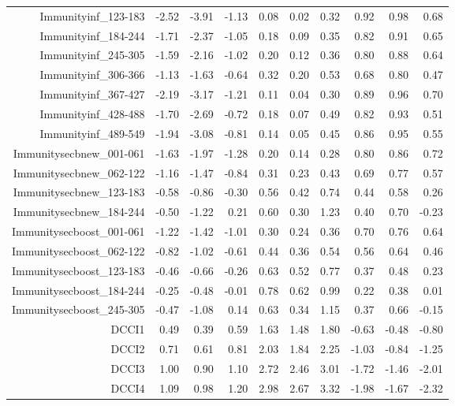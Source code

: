 \begin{table}[ht]
\begin{tabular}{rrrrrrrrrr}
  Immunityinf\_123-183 & -2.52 & -3.91 & -1.13 & 0.08 & 0.02 & 0.32 & 0.92 & 0.98 & 0.68 \\ 
  Immunityinf\_184-244 & -1.71 & -2.37 & -1.05 & 0.18 & 0.09 & 0.35 & 0.82 & 0.91 & 0.65 \\ 
  Immunityinf\_245-305 & -1.59 & -2.16 & -1.02 & 0.20 & 0.12 & 0.36 & 0.80 & 0.88 & 0.64 \\ 
  Immunityinf\_306-366 & -1.13 & -1.63 & -0.64 & 0.32 & 0.20 & 0.53 & 0.68 & 0.80 & 0.47 \\ 
  Immunityinf\_367-427 & -2.19 & -3.17 & -1.21 & 0.11 & 0.04 & 0.30 & 0.89 & 0.96 & 0.70 \\ 
  Immunityinf\_428-488 & -1.70 & -2.69 & -0.72 & 0.18 & 0.07 & 0.49 & 0.82 & 0.93 & 0.51 \\ 
  Immunityinf\_489-549 & -1.94 & -3.08 & -0.81 & 0.14 & 0.05 & 0.45 & 0.86 & 0.95 & 0.55 \\ 
  Immunitysecbnew\_001-061 & -1.63 & -1.97 & -1.28 & 0.20 & 0.14 & 0.28 & 0.80 & 0.86 & 0.72 \\ 
  Immunitysecbnew\_062-122 & -1.16 & -1.47 & -0.84 & 0.31 & 0.23 & 0.43 & 0.69 & 0.77 & 0.57 \\ 
  Immunitysecbnew\_123-183 & -0.58 & -0.86 & -0.30 & 0.56 & 0.42 & 0.74 & 0.44 & 0.58 & 0.26 \\ 
  Immunitysecbnew\_184-244 & -0.50 & -1.22 & 0.21 & 0.60 & 0.30 & 1.23 & 0.40 & 0.70 & -0.23 \\ 
  Immunitysecboost\_001-061 & -1.22 & -1.42 & -1.01 & 0.30 & 0.24 & 0.36 & 0.70 & 0.76 & 0.64 \\ 
  Immunitysecboost\_062-122 & -0.82 & -1.02 & -0.61 & 0.44 & 0.36 & 0.54 & 0.56 & 0.64 & 0.46 \\ 
  Immunitysecboost\_123-183 & -0.46 & -0.66 & -0.26 & 0.63 & 0.52 & 0.77 & 0.37 & 0.48 & 0.23 \\ 
  Immunitysecboost\_184-244 & -0.25 & -0.48 & -0.01 & 0.78 & 0.62 & 0.99 & 0.22 & 0.38 & 0.01 \\ 
  Immunitysecboost\_245-305 & -0.47 & -1.08 & 0.14 & 0.63 & 0.34 & 1.15 & 0.37 & 0.66 & -0.15 \\ 
  DCCI1 & 0.49 & 0.39 & 0.59 & 1.63 & 1.48 & 1.80 & -0.63 & -0.48 & -0.80 \\ 
  DCCI2 & 0.71 & 0.61 & 0.81 & 2.03 & 1.84 & 2.25 & -1.03 & -0.84 & -1.25 \\ 
  DCCI3 & 1.00 & 0.90 & 1.10 & 2.72 & 2.46 & 3.01 & -1.72 & -1.46 & -2.01 \\ 
  DCCI4 & 1.09 & 0.98 & 1.20 & 2.98 & 2.67 & 3.32 & -1.98 & -1.67 & -2.32 \\ 

\end{tabular}
\end{table}
